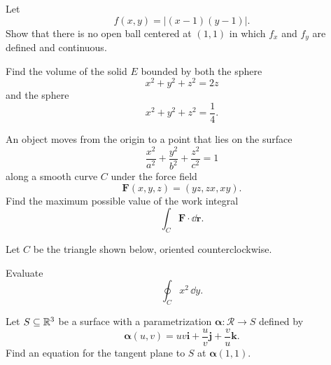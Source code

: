 \begin{problem}
Let
\[
f(x,y)=|(x-1)(y-1)|.
\]
Show that there is no open ball centered at $(1,1)$ in which $f_x$ and $f_y$ are defined and continuous.
\end{problem}

\begin{problem}
Find the volume of the solid $E$ bounded by both the sphere
\[
x^2+y^2+z^2=2z
\]
and the sphere
\[
x^2+y^2+z^2=\frac14.
\]
\end{problem}

\begin{problem}
An object moves from the origin to a point that lies on the surface
\[
\frac{x^2}{a^2}+\frac{y^2}{b^2}+\frac{z^2}{c^2}=1
\]
along a smooth curve $C$ under the force field
\[
\mathbf F(x,y,z)=(yz,zx,xy).
\]
Find the maximum possible value of the work integral
\[
\int_C\mathbf F\cdot\dd\mathbf r.
\]
\end{problem}

\begin{problem}
Let $C$ be the triangle shown below, oriented counterclockwise.

\begin{center}
\end{center}

Evaluate
\[
\oint_C x^2\,\dd y.
\]
\end{problem}

\begin{problem}
Let $S\subseteq\mathbb{R}^3$ be a surface with a parametrization $\boldsymbol{\alpha}\colon\mathcal R\to S$ defined by
\[
\boldsymbol{\alpha}(u,v)
=uv\mathbf i+\frac{u}{v}\mathbf j+\frac{v}{u}\mathbf k.
\]
Find an equation for the tangent plane to $S$ at $\boldsymbol{\alpha}(1,1)$.
\end{problem}

